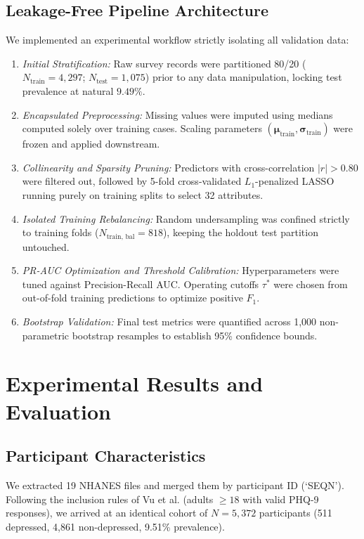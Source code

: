 \documentclass[conference]{IEEEtran}
\begin{document}
\subsection{Leakage-Free Pipeline Architecture}
We implemented an experimental workflow strictly isolating all validation data:
\begin{enumerate}
    \item \textit{Initial Stratification:} Raw survey records were partitioned 80/20 ($N_{\text{train}} = 4,297$; $N_{\text{test}} = 1,075$) prior to any data manipulation, locking test prevalence at natural $9.49\%$.
    \item \textit{Encapsulated Preprocessing:} Missing values were imputed using medians computed solely over training cases. Scaling parameters $(\boldsymbol{\mu}_{\text{train}}, \boldsymbol{\sigma}_{\text{train}})$ were frozen and applied downstream.
    \item \textit{Collinearity and Sparsity Pruning:} Predictors with cross-correlation $|r| > 0.80$ were filtered out, followed by 5-fold cross-validated $L_1$-penalized LASSO running purely on training splits to select 32 attributes.
    \item \textit{Isolated Training Rebalancing:} Random undersampling was confined strictly to training folds ($N_{\text{train, bal}} = 818$), keeping the holdout test partition untouched.
    \item \textit{PR-AUC Optimization and Threshold Calibration:} Hyperparameters were tuned against Precision-Recall AUC. Operating cutoffs $\tau^*$ were chosen from out-of-fold training predictions to optimize positive $F_1$.
    \item \textit{Bootstrap Validation:} Final test metrics were quantified across 1,000 non-parametric bootstrap resamples to establish 95\% confidence bounds.
\end{enumerate}

\section{Experimental Results and Evaluation}

\subsection{Participant Characteristics}
We extracted 19 NHANES files and merged them by participant ID (`SEQN'). Following the inclusion rules of Vu et al. \cite{vu2025} (adults $\ge 18$ with valid PHQ-9 responses), we arrived at an identical cohort of $N = 5,372$ participants (511 depressed, 4,861 non-depressed, 9.51\% prevalence). 
\end{document}
